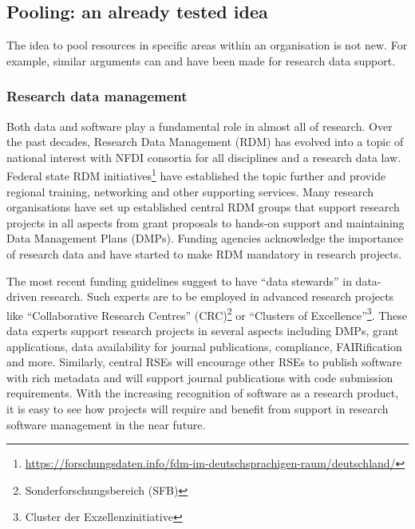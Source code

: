 \documentclass[a4paper]{article}
\begin{document}
\subsection{Pooling: an already tested idea}
The idea to pool resources in specific areas within an organisation is not new.
For example, similar arguments can and have been made for research data support.

\subsubsection{Research data management}
Both data and software play a fundamental role in almost all of research.
Over the past decades, Research Data Management (RDM) has evolved into a topic of national interest with NFDI consortia for all disciplines and a research data law.
Federal state RDM initiatives\footnote{\url{https://forschungsdaten.info/fdm-im-deutschsprachigen-raum/deutschland/}} have established the topic further and provide regional training, networking and other supporting services.
Many research organisations have set up established central RDM groups that support research projects in all aspects from grant proposals to hands-on support and maintaining Data Management Plans (DMPs).
Funding agencies acknowledge the importance of research data and have started to make RDM mandatory in research projects.

The most recent funding guidelines suggest to have “data stewards” in data-driven research.
Such experts are to be employed in advanced research projects like “Collaborative Research Centres” (CRC)\footnote{Sonderforschungsbereich (SFB)} or “Clusters of Excellence”\footnote{Cluster der Exzellenzinitiative}.
These data experts support research projects in several aspects including DMPs, grant applications, data availability for journal publications, compliance, FAIRification and more.
Similarly, central RSEs will encourage other RSEs to publish software with rich metadata and will support journal publications with code submission requirements.
With the increasing recognition of software as a research product, it is easy to see how projects will require and benefit from support in research software management in the near future.
\end{document}
